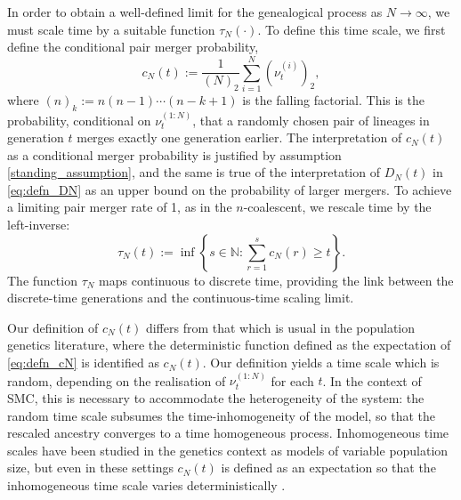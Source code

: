 \documentclass[12pt,authoryear]{article}
\theoremstyle{definition}
\newcommand{\1}[1]{\mathbbm{1}_{#1}}
\begin{document}
In order to obtain a well-defined limit for the genealogical process as $N\to\infty$, we must scale time by a suitable function $\tau_N(\cdot)$.
To define this time scale, we first define the conditional pair merger probability,
\begin{equation}\label{eq:defn_cN}
c_N(t) := \frac{1}{(N)_2} \sum_{i=1}^N (\nu_t^{(i)})_2,
\end{equation}
where $(n)_k := n (n - 1) \cdots (n - k + 1)$ is the falling factorial.
This is the probability, conditional on $\nu_t^{(1:N)}$, that a randomly chosen pair of lineages in generation $t$ merges exactly one generation earlier.
The interpretation of $c_N(t)$ as a conditional merger probability is justified by assumption \ref{standing_assumption}, and the same is true of the interpretation of $D_N(t)$ in \eqref{eq:defn_DN} as an upper bound on the probability of larger mergers.
To achieve a limiting pair merger rate of 1, as in the $n$-coalescent, we rescale time by the left-inverse:
\begin{equation}\label{eq:defn_tauN}
\tau_N(t) := \inf \left\{ s \in \mathbb{N} : \sum_{r=1}^s c_N(r) \geq t \right\} .
\end{equation}
The function $\tau_N$ maps continuous to discrete time, providing the link between the discrete-time generations and the continuous-time scaling limit.

Our definition of $c_N(t)$ differs from that which is usual in the population genetics literature, where the deterministic function defined as the expectation of \eqref{eq:defn_cN} is identified as $c_N(t)$.
Our definition yields a time scale which is random, depending on the realisation of $\nu_t^{(1:N)}$ for each $t$.
In the context of SMC, this is necessary to accommodate the heterogeneity of the system: the random time scale subsumes the time-inhomogeneity of the model, so that the rescaled ancestry converges to a time homogeneous process.
Inhomogeneous time scales have been studied in the genetics context as models of variable population size, but even in these settings $c_N(t)$ is defined as an expectation so that the inhomogeneous time scale varies deterministically \citep{mohle2002coal}.
\end{document}
